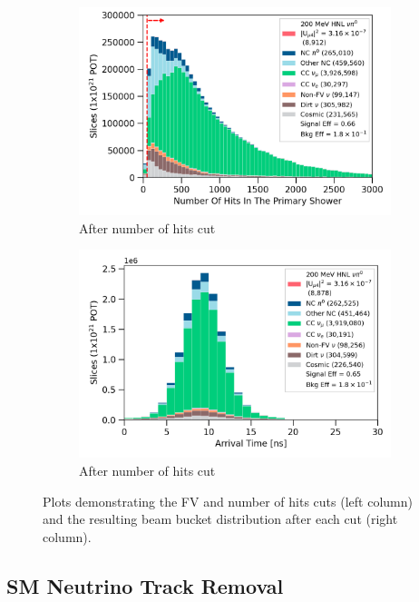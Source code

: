 \begin{figure}[htb]
\begin{subfigure}[b]{0.495\textwidth}
            \includegraphics[width=\textwidth]{nHits}
            \caption{After number of hits cut}%
            \label{fig:Nhits_cut}
        \end{subfigure}
        \hfill
        \begin{subfigure}[b]{0.495\textwidth}   
            \centering 
            \includegraphics[width=\textwidth]{beam_bucket_postNhits}
            \caption{After number of hits cut}%
            \label{fig:bb_postNhits}
        \end{subfigure}
        \caption{
		Plots demonstrating the FV and number of hits cuts (left column) and the resulting beam bucket distribution after each cut (right column). 
	}
        \label{fig:quality_cut}
\end{figure}

\subsection{SM Neutrino Track Removal}

